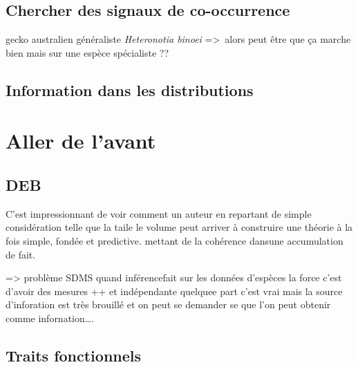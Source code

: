 \subsection*{Chercher des signaux de
co-occurrence}\label{chercher-des-signaux-de-co-occurrence}

gecko australien généraliste \emph{Heteronotia binoei}
=\textgreater{}~alors peut être que ça marche bien mais sur une espèce
spécialiste ??

\subsection*{Information dans les
distributions}\label{information-dans-les-distributions}

\section*{Aller de l'avant}\label{aller-de-lavant}

\subsection{DEB}\label{deb}

C'est impressionnant de voir comment un auteur en repartant de simple
considération telle que la taile le volume peut arriver à construire une
théorie à la fois simple, fondée et predictive. mettant de la cohérence
dansune accumulation de fait.

=\textgreater{} problème SDMS quand inférencefait sur les données
d'espèces la force c'est d'avoir des mesures ++ et indépendante quelquee
part c'est vrai mais la source d'inforation est très brouillé et on peut
se demander se que l'on peut obtenir comme infornation\ldots{}.

\subsection*{Traits fonctionnels}\label{traits-fonctionnels}

